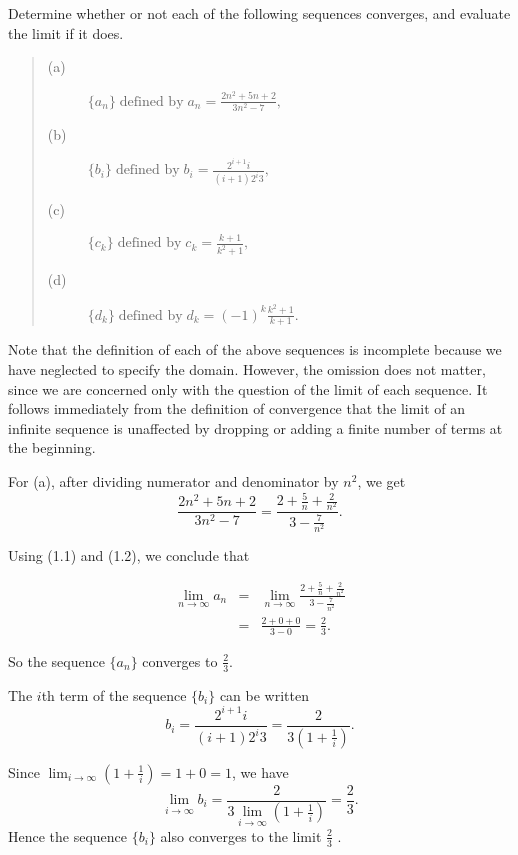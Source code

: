 \begin{example}
Determine whether or not each of the following sequences converges, and evaluate the limit if it does.
 
\begin{quote}
\begin{description}
\item[(a)] $\{a_n\}\; \mbox{defined by}\; a_n = \frac{2n^2 + 5n + 2}{3n^2 - 7},$ 
\item[(b)] $\{b_i\}\; \mbox{defined by}\; b_i  = \frac{2^{i + 1} i}{(i + 1)2^{i}3},$ 
\item[(c)] $\{c_k\}\; \mbox{defined by}\; c_k  = \frac{k + 1}{k^2 + 1},$ 
\item[(d)] $\{d_k\}\; \mbox{defined by}\; d_k = (-1)^k \frac{k^2 + 1}{k + 1}.$
\end{description}
\end{quote}

\noindent Note that the definition of each of the above sequences is incomplete because we have neglected to specify the domain. However, the omission does not matter, since we are concerned only with the question of the limit of each
sequence. It follows immediately from the definition of convergence that the limit of an infinite sequence is unaffected by dropping or adding a finite number of terms at the beginning. 

For (a), after dividing numerator and denominator by $n^2$, we get
$$
\frac{2n^2 + 5n + 2}{3n^2 - 7} = \frac{2 + \frac{5}{n} + \frac{2}{n^2} }{3 - \frac{7}{n^2}} . 
$$

\noindent Using (1.1) and (1.2), we conclude that

\begin{eqnarray*}
\lim_{n \rightarrow \infty} a_n 
&=& \lim_{n \rightarrow \infty} \frac{2 + \frac{5}{n} + \frac{2}{n^2}}{3 - \frac{7}{n^2}} \\
&=& \frac{2+0+0}{ 3 - 0} = \frac{2}{3} .
\end{eqnarray*}

\noindent So the sequence $\{a_n\}$ converges to $\frac{2}{3}$.

The $i$th term of the sequence $\{b_i \}$ can be written 
$$
b_i = \frac{2^{i + 1} i}{(i + 1)2^{i} 3} = \frac{2}{3(1 + \frac{1}{i})} .
$$

\noindent Since $\lim_{i \rightarrow \infty} (1 + \frac{1}{i}) = 1 + 0 = 1$, we have  
$$
\lim_{i \rightarrow \infty} b_i = \frac{ 2}{3 \lim_{i \rightarrow \infty} (1 + \frac{1}{i})} = \frac{2}{3} .
$$
\noindent Hence the sequence $\{b_i \}$ also converges to the limit $\frac{2}{3}$ .


\end{example}
